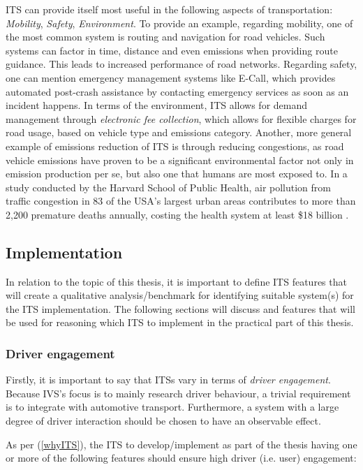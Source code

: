 \documentclass[main.tex]{subfiles}
\begin{document}
ITS can provide itself most useful in the following aspects of transportation: 
\emph{Mobility}, \emph{Safety}, \emph{Environment}. To provide an example, regarding mobility, 
one of the most common system is routing and navigation for road vehicles. Such systems can 
factor in time, distance and even emissions when providing route guidance. This leads to 
increased performance of road networks. Regarding safety, one can mention emergency management
systems like E-Call, which provides automated post-crash assistance by contacting emergency
services as soon as an incident happens. In terms of the environment, 
ITS allows for demand management through \emph{electronic fee collection}, which allows for 
flexible charges for road usage, based on vehicle type and emissions category. \cite{Commision2022}
Another, more general example of emissions reduction of ITS is through reducing congestions, as road vehicle 
emissions have proven to be a significant environmental factor not only in emission production
per se, but also one that humans are most exposed to. In a study conducted by the Harvard
School of Public Health, air pollution from traffic congestion in 83 of the USA's largest urban
areas contributes to more than 2,200 premature deaths annually, costing the health system at
least \$18 billion \cite{Levy2011}.

\subsection{Implementation}

In relation to the topic of this thesis, it is important to define ITS features that will create a
qualitative analysis/benchmark for identifying suitable system(s) for the ITS implementation. The following 
sections will discuss and features that will be used for reasoning which ITS to implement in the 
practical part of this thesis.

\subsubsection{Driver engagement}

Firstly, it is important to say that ITSs vary in terms of \emph{driver engagement}. Because
IVS's focus is to mainly research driver behaviour, a trivial requirement is to integrate with 
automotive transport. Furthermore, a system with a large degree of driver interaction should be
chosen to have an observable effect. 

As per (\ref{whyITS}), the ITS to develop/implement as part of the thesis having one or more of 
the following features should ensure high driver (i.e. user) engagement:
\end{document}
